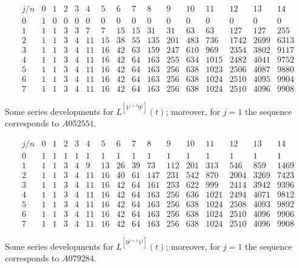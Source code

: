 
\begin{table}
\begin{equation*}\begin{array}{c|ccccccccccccccc}j/n & 0 & 1 & 2 & 3 & 4 & 5 & 6 & 7 & 8 & 9 & 10 & 11 & 12 & 13 & 14\\\hline0 & 1 & 0 & 0 & 0 & 0 & 0 & 0 & 0 & 0 & 0 & 0 & 0 & 0 & 0 & 0\\1 & 1 & 1 & 3 & 3 & 7 & 7 & 15 & 15 & 31 & 31 & 63 & 63 & 127 & 127 & 255\\2 & 1 & 1 & 3 & 4 & 11 & 15 & 38 & 55 & 135 & 201 & 483 & 736 & 1742 & 2699 & 6313\\3 & 1 & 1 & 3 & 4 & 11 & 16 & 42 & 63 & 159 & 247 & 610 & 969 & 2354 & 3802 & 9117\\4 & 1 & 1 & 3 & 4 & 11 & 16 & 42 & 64 & 163 & 255 & 634 & 1015 & 2482 & 4041 & 9752\\5 & 1 & 1 & 3 & 4 & 11 & 16 & 42 & 64 & 163 & 256 & 638 & 1023 & 2506 & 4087 & 9880\\6 & 1 & 1 & 3 & 4 & 11 & 16 & 42 & 64 & 163 & 256 & 638 & 1024 & 2510 & 4095 & 9904\\7 & 1 & 1 & 3 & 4 & 11 & 16 & 42 & 64 & 163 & 256 & 638 & 1024 & 2510 & 4096 & 9908\end{array}\end{equation*}
\caption{Some series developments for $L^{[1^{j+1}0^j]}(t)$; moreover, for
$j=1$ the sequence corresponds to $A052551$.}
\label{tbl:L1_j1:0_j}
\end{table}

\begin{table}
\begin{equation*}\begin{array}{c|ccccccccccccccc}j/n & 0 & 1 & 2 & 3 & 4 & 5 & 6 & 7 & 8 & 9 & 10 & 11 & 12 & 13 & 14\\\hline0 & 1 & 1 & 1 & 1 & 1 & 1 & 1 & 1 & 1 & 1 & 1 & 1 & 1 & 1 & 1\\1 & 1 & 1 & 3 & 4 & 9 & 13 & 26 & 39 & 73 & 112 & 201 & 313 & 546 & 859 & 1469\\2 & 1 & 1 & 3 & 4 & 11 & 16 & 40 & 61 & 147 & 231 & 542 & 870 & 2004 & 3269 & 7423\\3 & 1 & 1 & 3 & 4 & 11 & 16 & 42 & 64 & 161 & 253 & 622 & 999 & 2414 & 3942 & 9396\\4 & 1 & 1 & 3 & 4 & 11 & 16 & 42 & 64 & 163 & 256 & 636 & 1021 & 2494 & 4071 & 9812\\5 & 1 & 1 & 3 & 4 & 11 & 16 & 42 & 64 & 163 & 256 & 638 & 1024 & 2508 & 4093 & 9892\\6 & 1 & 1 & 3 & 4 & 11 & 16 & 42 & 64 & 163 & 256 & 638 & 1024 & 2510 & 4096 & 9906\\7 & 1 & 1 & 3 & 4 & 11 & 16 & 42 & 64 & 163 & 256 & 638 & 1024 & 2510 & 4096 & 9908\end{array}\end{equation*}
\caption{Some series developments for $L^{[0^{j+1}1^j]}(t)$; moreover, for
$j=1$ the sequence corresponds to $A079284$.}
\label{tbl:L0_j1:1_j}
\end{table}

